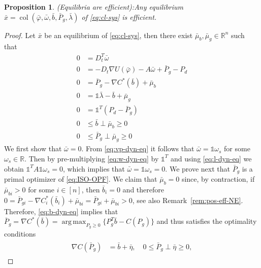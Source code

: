 \documentclass[journal]{IEEEtran}
\newcommand{\w}{\omega}
\newcommand{\1}{\mathds 1}
\newcommand{\vp}{\varphi}
\newcommand{\real}{\mathbb{R}}
\newcommand{\longthmtitle}[1]{\mbox{}\textup{\textsl{(#1):}}}
\renewcommand{\l}{\lambda}
\DeclareMathOperator{\col}{col}
\DeclareMathOperator*{\argmax}{arg\,max}
\newtheorem{proposition}[theorem]{Proposition}
\theoremstyle{remark}
\theoremstyle{definition}
\begin{document}
\begin{proposition}\longthmtitle{Equilibria are
    efficient}\label{prop:eq-are-optimal-Nash}
  Any equilibrium $\bar x=\col(\bar \vp,\bar \w,\bar b,\bar P_g,\bar
  \l)$ of \eqref{eq:cl-sys} is efficient.
\end{proposition}
\begin{proof}
  Let $\bar x$ be an equilibrium of \eqref{eq:cl-sys}, then there
  exist $\bar \mu_b,\bar \mu_g\in\real^n$ such that
  \begin{subequations}\label{eq:cl-sys-eq}
    \begin{align}
      0&=D_t^T\bar \w\label{eq:vp-dyn-eq}
      \\
      0&=-D_t\nabla U(\bar \vp)-A\bar \w+\bar
      P_g-P_d\label{eq:w-dyn-eq}
      \\
      0&=\bar P_g-\nabla C^*(\bar b)+\bar\mu_b\label{eq:b-dyn-eq}
      \\
      0&=\1\bar\l-\bar b+\bar\mu_g\label{eq:Pg-dyn-eq}
      \\
      0&=\1^T(P_d-\bar P_g)\label{eq:l-dyn-eq}
      \\
      0&\leq \bar b\perp \bar\mu_b\geq0\label{eq:b-comp-slack-eq}\\
      0&\leq\bar P_g\perp \bar \mu_g\geq0\label{eq:Pg-comp-slack-eq}
    \end{align}
  \end{subequations}
  We first show that $\bar \w=0$. From \eqref{eq:vp-dyn-eq} it follows
  that $\bar \w=\1\w_s$ for some $\w_s\in\real$. Then by
  pre-multiplying \eqref{eq:w-dyn-eq} by $\1^T$ and using
  \eqref{eq:l-dyn-eq} we obtain $\1^TA\1\w_s=0$, which implies that
  $\bar \w=\1\w_s=0$. We prove next that $\bar{P}_g$ is a primal
  optimizer of \eqref{eq:ISO-OPF}.
  We claim that $\bar \mu_b=0$ since, by contraction, if $\bar
  \mu_{bi}>0$ for some $i\in[n]$, then $\bar b_i=0$ and therefore
  $0=\bar P_{gi}-\nabla C_i^*(\bar b_i)+\bar \mu_{bi}=\bar P_{gi}+\bar
  \mu_{bi}>0$, see also Remark~\ref{rem:pos-eff-NE}. Therefore,
  \eqref{eq:b-dyn-eq} implies that $\bar P_g=\nabla C^*(\bar
  b)=\argmax_{P_{g}\geq0}\{P_g^T\bar b-C(P_g)\}$ and thus satisfies
  the optimality conditions
  \begin{align}\label{eq:KKTcon-eff-bid-C*}
    \begin{aligned}
      \nabla C(\bar P_g)&=\bar b+\bar \eta, \quad 0\leq \bar P_g\perp\bar\eta\geq 0,
    \end{aligned}

\end{align}
\end{proof}
\end{document}
